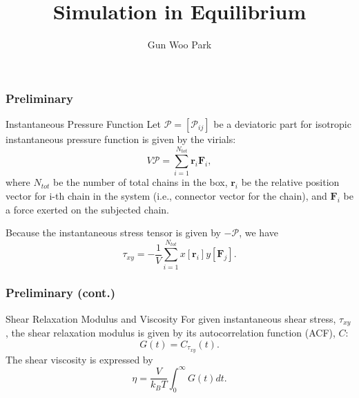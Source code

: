 \documentclass[slidestop, compress, mathserif]{beamer}
\title{Simulation in Equilibrium}
\author{Gun Woo Park}
\begin{document}
\begin{frame}[plain]
\maketitle
\end{frame}

\begin{frame}
  \frametitle<presentation>{Preliminary}
  \vspace{-0.15in}
  \begin{block}{Instantaneous Pressure Function}
    Let $\mathscr{P} = \left[\mathscr{P}_{ij}\right]$ be a deviatoric part for isotropic instantaneous pressure function is given by the virials:
    \vspace{-0.2in}
    \begin{equation}
      V\mathscr{P} = \sum_{i=1}^{N_{tot}} \mathbf{r}_i\mathbf{F}_i,
    \end{equation}
    where $N_{tot}$ be the number of total chains in the box, $\mathbf{r}_i$ be the relative position vector for i-th chain in the system (i.e., connector vector for the chain), and $\mathbf{F}_i$ be a force exerted on the subjected chain. 
  \end{block}
    Because the instantaneous stress tensor is given by $-\mathscr{P}$, we have
  \begin{equation}
    \tau_{xy} = -\frac{1}{V}\sum_{i=1}^{N_{tot}} x\left[\mathbf{r}_i\right]y\left[\mathbf{F}_j\right].
  \end{equation}
\end{frame}

\begin{frame}
  \frametitle<presentation>{Preliminary (cont.)}
  \begin{block}{Shear Relaxation Modulus and Viscosity}
    For given instantaneous shear stress, $\tau_{xy}$, the shear relaxation modulus is given by its autocorrelation function (ACF), $C$:
    \begin{equation}
      G(t) = C_{\tau_{xy}}(t).
    \end{equation}
    The shear viscosity is expressed by
    \begin{equation}
      \eta = \frac{V}{k_BT} \int_{0}^{\infty} G(t) dt.
    \end{equation}
  \end{block}
\end{frame}
\end{document}
